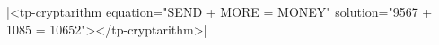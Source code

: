 \documentclass{article}
\begin{document}
\rawhtml|<tp-cryptarithm equation="SEND + MORE = MONEY" solution="9567 + 1085 = 10652"></tp-cryptarithm>|
\end{document}
